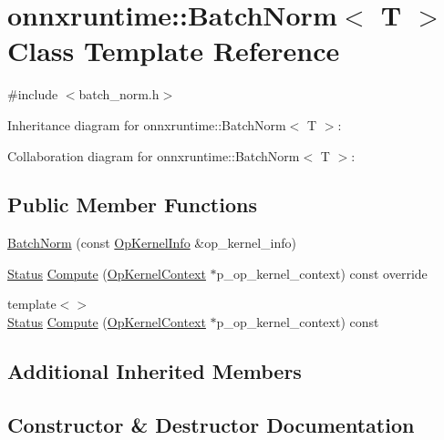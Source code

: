 \hypertarget{classonnxruntime_1_1BatchNorm}{}\section{onnxruntime\+:\+:Batch\+Norm$<$ T $>$ Class Template Reference}
\label{classonnxruntime_1_1BatchNorm}


{\ttfamily \#include $<$batch\+\_\+norm.\+h$>$}



Inheritance diagram for onnxruntime\+:\+:Batch\+Norm$<$ T $>$\+:


Collaboration diagram for onnxruntime\+:\+:Batch\+Norm$<$ T $>$\+:
\subsection*{Public Member Functions}
\begin{DoxyCompactItemize}
\item 
\mbox{\hyperlink{classonnxruntime_1_1BatchNorm_acc023ea586d509607f3b0ddebd9cddd2}{Batch\+Norm}} (const \mbox{\hyperlink{classonnxruntime_1_1OpKernelInfo}{Op\+Kernel\+Info}} \&op\+\_\+kernel\+\_\+info)
\item 
\mbox{\hyperlink{classonnxruntime_1_1common_1_1Status}{Status}} \mbox{\hyperlink{classonnxruntime_1_1BatchNorm_ab13471fc99135059f07247a3bfcff208}{Compute}} (\mbox{\hyperlink{classonnxruntime_1_1OpKernelContext}{Op\+Kernel\+Context}} $\ast$p\+\_\+op\+\_\+kernel\+\_\+context) const override
\item 
{\footnotesize template$<$$>$ }\\\mbox{\hyperlink{classonnxruntime_1_1common_1_1Status}{Status}} \mbox{\hyperlink{classonnxruntime_1_1BatchNorm_a2c6b47dac4b310d44eca0d9a6d39bb72}{Compute}} (\mbox{\hyperlink{classonnxruntime_1_1OpKernelContext}{Op\+Kernel\+Context}} $\ast$p\+\_\+op\+\_\+kernel\+\_\+context) const
\end{DoxyCompactItemize}
\subsection*{Additional Inherited Members}


\subsection{Constructor \& Destructor Documentation}
\mbox{\label{classonnxruntime_1_1BatchNorm_acc023ea586d509607f3b0ddebd9cddd2}} 
